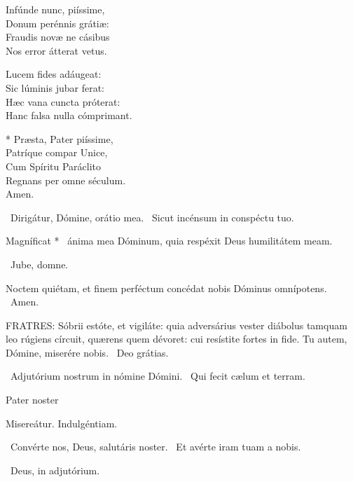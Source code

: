 Infúnde nunc, piíssime,\\
Donum perénnis grátiæ:\\
Fraudis novæ ne cásibus\\
Nos error átterat vetus.

Lucem fides adáugeat:\\
Sic lúminis jubar ferat:\\
Hæc vana cuncta próterat:\\
Hanc falsa nulla cómprimant.

* Præsta, Pater piíssime,\\
Patríque compar Unice,\\
Cum Spíritu Paráclito\\
Regnans per omne séculum.\\
Amen.

\V\ Dirigátur, Dómine, orátio mea. \R\ Sicut incénsum in conspéctu tuo.


 Magníficat * \textdagger\ ánima mea Dóminum, quia respéxit Deus humilitátem meam.


\sectionornament


\V\ Jube, domne.

 Noctem quiétam, et finem perféctum concédat nobis Dóminus omnípotens. \R\ Amen.


\lettrine[lines=2]{F}{RATRES}: Sóbrii estóte, et vigiláte: quia adversárius vester diábolus tamquam leo rúgiens círcuit, quærens quem dévoret: cui resístite fortes in fide. Tu autem, Dómine, miserére nobis. \R\ Deo grátias.

\V\ Adjutórium nostrum in nómine Dómini. \R\ Qui fecit cælum et terram.

Pater noster 

 Misereátur. Indulgéntiam.

\V\ Convérte nos, Deus, salutáris noster. \R\ Et avérte iram tuam a nobis.

\V\ Deus, in adjutórium.

